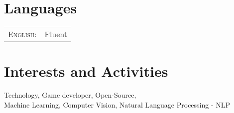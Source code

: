 \documentclass[a4paper,10pt]{article}
\begin{document}
\section{Languages}
\begin{tabular}{rl}
\textsc{English:}&Fluent\\
\end{tabular}

\section{Interests and Activities}
Technology, Game developer, Open-Source,\\
Machine Learning, Computer Vision, Natural Language Processing - NLP\\
\end{document}
